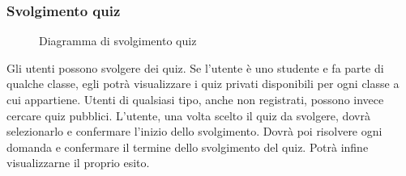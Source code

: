 \documentclass[a4paper, titlepage]{article}
\begin{document}
\subsubsection{Svolgimento quiz}
\begin{figure}[H]
	\centering
	\noindent{}
	\caption{Diagramma di svolgimento quiz}
\end{figure}
Gli utenti possono svolgere dei quiz. Se l’utente è uno studente e fa parte di qualche classe, egli potrà visualizzare i quiz privati disponibili per ogni classe a cui appartiene.
Utenti di qualsiasi tipo, anche non registrati, possono invece cercare quiz pubblici. 
L’utente, una volta scelto il quiz da svolgere, dovrà selezionarlo e confermare l’inizio dello svolgimento. Dovrà poi risolvere ogni domanda e confermare il termine dello svolgimento del quiz. Potrà infine visualizzarne il proprio esito.
\end{document}
